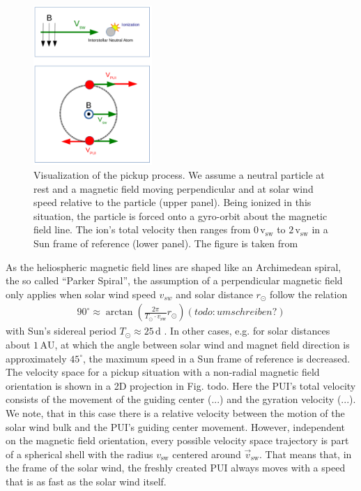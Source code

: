 \begin{figure}[h]
	\includegraphics[width=0.4\textwidth]{Figures/pu_process_1_2.png}
	\centering
	\caption{Visualization of the pickup process. We assume a neutral particle at rest and a magnetic field moving perpendicular and at solar wind speed relative to the particle (upper panel). Being ionized in this situation, the particle is forced onto a gyro-orbit about the magnetic field line. The ion's total velocity then ranges from $0\, \mathrm{v_{\mathrm{sw}}} $ to $2 \, \mathrm{v_{\mathrm{sw}}}$ in a Sun frame of reference (lower panel). The figure is taken from \citet{talk_etss} }
	\label{fig:pu_proc}
\end{figure}
As the heliospheric magnetic field lines are shaped like an Archimedean spiral, the so called ``Parker Spiral'', the assumption of a perpendicular magnetic field only applies when solar wind speed $v_{sw}$ and solar distance $r_\odot$ follow the relation
\begin{align*}
90 ^\circ \approx  \arctan \left( \frac{2\pi}{T_\odot \cdot v_{\mathrm{sw}}} r_\odot \right) (todo:umschreiben?)
\end{align*}
with Sun's sidereal period $T_\odot \approx 25\,\mathrm{d}$ \citep{prlss_2004}.
In other cases, e.g. for solar distances about $1\,\mathrm{AU}$, at which the angle between solar wind and magnet field direction is approximately $45^\circ$, the maximum speed in a Sun frame of reference is decreased.
\\
The velocity space for a pickup situation with a non-radial magnetic field orientation is shown in a 2D projection in Fig. todo. Here the PUI's total velocity consists of the movement of the guiding center (...) and the gyration velocity (...). We note, that in this case there is a relative velocity between the motion of the solar wind bulk and the PUI's guiding center movement. However, independent on the magnetic field orientation, every possible velocity space trajectory is part of a spherical shell with the radius $v_{\mathrm{sw}}$ centered around $\vec{v}_{\mathrm{sw}}$. That means that, in the frame of the solar wind, the freshly created PUI always moves with a speed that is as fast as the solar wind itself.
